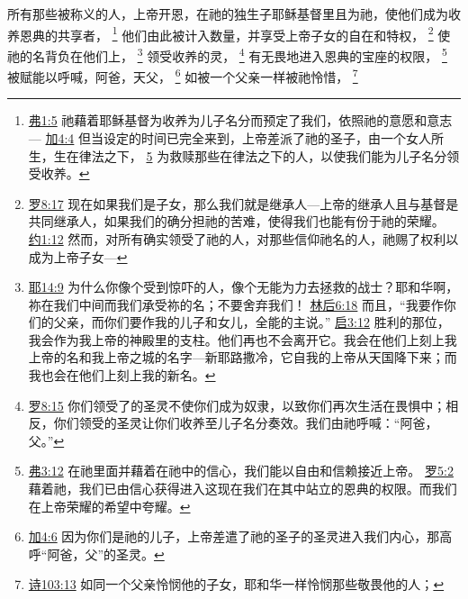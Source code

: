 \documentclass[12pt, a4paper, oneside]{ctexart}
\begin{document}
所有那些被称义的人，上帝开恩，在祂的独生子耶稣基督里且为祂，使他们成为收养恩典的共享者，
	\footnote {
		\href{https://biblehub.com/ephesians/1-5.htm}{弗1:5} 祂藉着耶稣基督为收养为儿子名分而预定了我们，依照祂的意愿和意志---
		\href{https://biblehub.com/galatians/4-4.htm}{加4:4} 但当设定的时间已完全来到，上帝差派了祂的圣子，由一个女人所生，生在律法之下，
		\href{https://biblehub.com/galatians/4-5.htm}{5} 为救赎那些在律法之下的人，以使我们能为儿子名分领受收养。
	}
	他们由此被计入数量，并享受上帝子女的自在和特权，
	\footnote {
		\href{https://biblehub.com/romans/8-17.htm}{罗8:17} 现在如果我们是子女，那么我们就是继承人---上帝的继承人且与基督是共同继承人，如果我们的确分担祂的苦难，使得我们也能有份于祂的荣耀。
		\href{https://biblehub.com/john/1-12.htm}{约1:12} 然而，对所有确实领受了祂的人，对那些信仰祂名的人，祂赐了权利以成为上帝子女---
	}
	使祂的名背负在他们上，
	\footnote {
		\href{https://biblehub.com/jeremiah/14-9.htm}{耶14:9} 为什么你像个受到惊吓的人，像个无能为力去拯救的战士？耶和华啊，祢在我们中间而我们承受祢的名；不要舍弃我们！
		\href{https://biblehub.com/2_corinthians/6-18.htm}{林后6:18} 而且，“我要作你们的父亲，而你们要作我的儿子和女儿，全能的主说。”
		\href{https://biblehub.com/revelation/3-12.htm}{启3:12} 胜利的那位，我会作为我上帝的神殿里的支柱。他们再也不会离开它。我会在他们上刻上我上帝的名和我上帝之城的名字---新耶路撒冷，它自我的上帝从天国降下来；而我也会在他们上刻上我的新名。
	}
	领受收养的灵，
	\footnote {
		\href{https://biblehub.com/romans/8-15.htm}{罗8:15} 你们领受了的圣灵不使你们成为奴隶，以致你们再次生活在畏惧中；相反，你们领受的圣灵让你们收养至儿子名分奏效。我们由祂呼喊：“阿爸，父。”
	}
	有无畏地进入恩典的宝座的权限，
	\footnote {
		\href{https://biblehub.com/ephesians/3-12.htm}{弗3:12} 在祂里面并藉着在祂中的信心，我们能以自由和信赖接近上帝。
		\href{https://biblehub.com/romans/5-2.htm}{罗5:2} 藉着祂，我们已由信心获得进入这现在我们在其中站立的恩典的权限。而我们在上帝荣耀的希望中夸耀。
	}
	被赋能以呼喊，阿爸，天父，
	\footnote {
		\href{https://biblehub.com/galatians/4-6.htm}{加4:6} 因为你们是祂的儿子，上帝差遣了祂的圣子的圣灵进入我们内心，那高呼“阿爸，父”的圣灵。
	}
	如被一个父亲一样被祂怜惜，
	\footnote {
		\href{https://biblehub.com/psalms/103-13.htm}{诗103:13} 如同一个父亲怜悯他的子女，耶和华一样怜悯那些敬畏他的人；
	}
\end{document}
